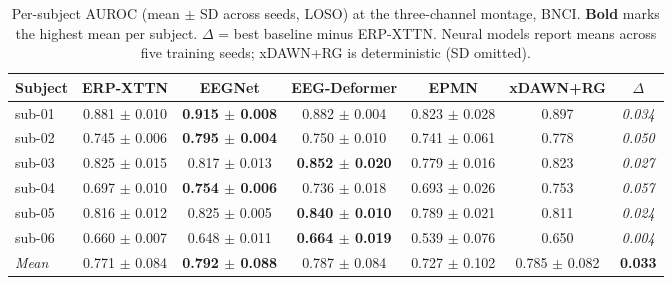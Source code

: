 \begin{table}[t]
\centering
\caption{Per-subject AUROC (mean $\pm$ SD across seeds, LOSO) at the three-channel montage, BNCI. \textbf{Bold} marks the highest mean per subject. $\Delta$ = best baseline minus ERP-XTTN. Neural models report means across five training seeds; xDAWN+RG is deterministic (SD omitted).}
\label{sup:tab-persubj-bnci}
\begin{tabular}{lcccccc}
\toprule
Subject & ERP-XTTN & EEGNet & EEG-Deformer & EPMN & xDAWN+RG & $\Delta$ \\
\midrule
sub-01 & 0.881 $\pm$ 0.010 & \textbf{0.915 $\pm$ 0.008} & 0.882 $\pm$ 0.004 & 0.823 $\pm$ 0.028 & 0.897 & \textit{0.034} \\
sub-02 & 0.745 $\pm$ 0.006 & \textbf{0.795 $\pm$ 0.004} & 0.750 $\pm$ 0.010 & 0.741 $\pm$ 0.061 & 0.778 & \textit{0.050} \\
sub-03 & 0.825 $\pm$ 0.015 & 0.817 $\pm$ 0.013 & \textbf{0.852 $\pm$ 0.020} & 0.779 $\pm$ 0.016 & 0.823 & \textit{0.027} \\
sub-04 & 0.697 $\pm$ 0.010 & \textbf{0.754 $\pm$ 0.006} & 0.736 $\pm$ 0.018 & 0.693 $\pm$ 0.026 & 0.753 & \textit{0.057} \\
sub-05 & 0.816 $\pm$ 0.012 & 0.825 $\pm$ 0.005 & \textbf{0.840 $\pm$ 0.010} & 0.789 $\pm$ 0.021 & 0.811 & \textit{0.024} \\
sub-06 & 0.660 $\pm$ 0.007 & 0.648 $\pm$ 0.011 & \textbf{0.664 $\pm$ 0.019} & 0.539 $\pm$ 0.076 & 0.650 & \textit{0.004} \\
\midrule
\textit{Mean} & 0.771 $\pm$ 0.084 & \textbf{0.792 $\pm$ 0.088} & 0.787 $\pm$ 0.084 & 0.727 $\pm$ 0.102 & 0.785 $\pm$ 0.082 & \textbf{0.033} \\
\bottomrule
\end{tabular}
\end{table}

